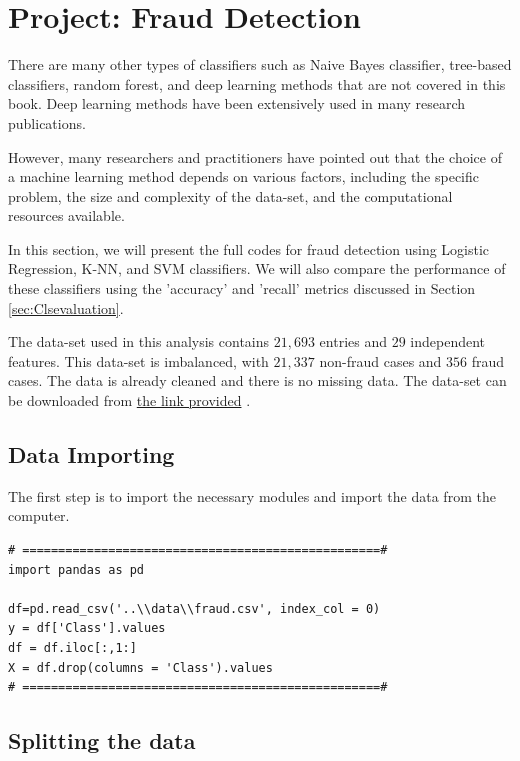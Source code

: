 \newpage
\section{Project: Fraud Detection}\label{sec:cls_proj1}
There are many other types of classifiers such as Naive Bayes classifier, tree-based classifiers, random forest, and deep learning methods that are not covered in this book. Deep learning methods have been extensively used in many research publications.

However, many researchers and practitioners have pointed out that the choice of a machine learning method depends on various factors, including the specific problem, the size and complexity of the data-set, and the computational resources available.

In this section, we will present the full codes for fraud detection using Logistic Regression, K-NN, and SVM classifiers. We will also compare the performance of these classifiers using the 'accuracy' and 'recall' metrics discussed in Section \ref{sec:Clsevaluation}.

The data-set \cite{web:fraudData} used in this analysis contains $21,693$ entries and $29$ independent features. This data-set is imbalanced, with $21,337$ non-fraud cases and $356$ fraud cases. The data is already cleaned and there is no missing data. The data-set can be downloaded from \href{https://github.com/yonycherkos/Applied-Data-Science-with-Python-Specialization.git}{the link provided} \cite{web:fraudData}.

\newpage
\subsection{Data Importing}
The first step is to import the necessary modules and import the data from the computer.

\begin{lstlisting}
# ==================================================#
import pandas as pd

df=pd.read_csv('..\\data\\fraud.csv', index_col = 0)
y = df['Class'].values
df = df.iloc[:,1:]
X = df.drop(columns = 'Class').values
# ==================================================#
\end{lstlisting}

\subsection{Splitting the data}

